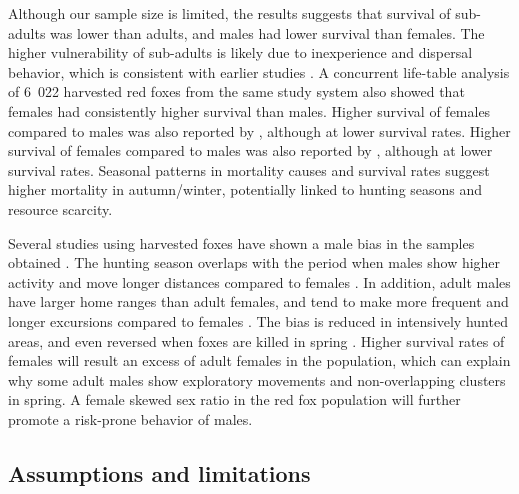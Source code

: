 \documentclass[12pt,a4paper,final,abstract=true,headings=small]{scrartcl}
\begin{document}
Although our sample size is limited, the results suggests that survival of sub-adults was lower than adults, and males had lower survival than females. The higher vulnerability of sub-adults is likely due to inexperience and dispersal behavior, which is consistent with earlier studies \citep{gosselinkSurvivalCauseSpecificMortality2007,yonedaEffectsHuntingAge1982,goszczynskiPopulationDynamicsRed1989,harrisDemographyTwoUrban1987,willebrandDecliningSurvivalRates2022}.  A concurrent life-table analysis of 6~022 harvested red foxes from the same study system also showed that females had consistently higher survival than males. Higher survival of females compared to males was also reported by  \citet{heydonDemographyRuralFoxes2000}, although at lower survival rates. Higher survival of females compared to males was also reported by  \citet{heydonDemographyRuralFoxes2000}, although at lower survival rates. Seasonal patterns in mortality causes and survival rates suggest higher mortality in autumn/winter, potentially linked to hunting seasons and resource scarcity.

Several studies using harvested foxes have shown a male bias in the samples obtained \citep{harrisDemographyTwoUrban1987,gortazarHabitatRelatedDifferences2003,goszczynskiPopulationDynamicsRed1989,yonedaEffectsHuntingAge1982,englundAspectsReproductionMortality1970,hartova-nentvichovaCranialOntogeneticVariability2010}. The hunting season overlaps with the period when males show higher activity and move longer distances compared to females \citep{englundPopulationDynamicsRed1980}. In addition, adult males have larger home ranges than adult females, and tend to make more frequent and longer excursions compared to females \citep{soulsburyBehavioralSpatialAnalysis2011}.  The bias is reduced in intensively hunted areas, and even reversed when foxes are killed in spring \citep{yonedaEffectsHuntingAge1982,goszczynskiPopulationDynamicsRed1989, galbyMoreFemaleRed2010}. Higher survival rates of females will result an excess of adult females in the population, which can explain why some adult males show exploratory movements and non-overlapping clusters in spring. A female skewed sex ratio in the red fox population will further promote a risk-prone behavior of males.



\subsection*{Assumptions and limitations}
\end{document}
